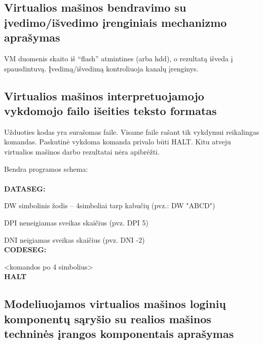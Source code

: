 \subsection{Virtualios mašinos bendravimo su įvedimo/išvedimo įrenginiais
mechanizmo aprašymas}

VM duomenis skaito iš ``flash'' atmintines (arba hdd), o rezultatą išveda į spausdintuvą. Įvedimą/išvedimą kontroliuoja kanalų įrenginys.

\subsection{Virtualios mašinos interpretuojamojo vykdomojo failo išeities 
teksto formatas}

Užduoties kodas yra surašomas faile. Visame faile rašant tik vykdymui reikalingas
komandas. Paskutinė vykdoma komanda privalo būti HALT. Kitu atveju virtualios mašinos darbo
rezultatai nėra apibrėžti.

Bendra programos schema:\\
\\\textbf{DATASEG:}

DW simbolinis žodis – 4simboliai tarp kabučių (pvz.: DW "ABCD")

DPI neneigiamas sveikas skaičius (pvz. DPI 5)

DNI neigiamas sveikas skaičius (pvz. DNI -2)
\\\textbf{CODESEG:}

<komandos po 4 simbolius>\\
\textbf{HALT}

\subsection{Modeliuojamos virtualios mašinos loginių komponentų sąryšio su 
realios mašinos techninės įrangos komponentais aprašymas}

